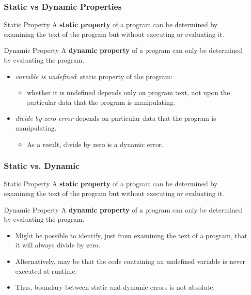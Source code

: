 \documentclass{beamer}
\begin{document}
\begin{frame}[fragile]
\frametitle{Static vs Dynamic Properties}

\begin{block}{Static Property}
A {\bf static property} of a program can be determined by examining the text of the program but without executing or evaluating it.
\end{block}

\begin{block}{Dynamic Property}
A {\bf dynamic property} of a program can only be determined by evaluating the program.
\end{block}

\pause
\begin{itemize}
\item \emph{variable is undefined}: static property of the program: 
\begin{itemize}
\item whether it is undefined depends only on program text, not upon the particular data that the program is manipulating. 
\end{itemize}

\pause
\item \emph{divide by zero error} depends on particular data that the program is manipulating. 
\begin{itemize}
\item As a result, divide by zero is a dynamic error.
\end{itemize}

\end{itemize}

\end{frame}

\begin{frame}[fragile]
\frametitle{Static vs. Dynamic}
\begin{block}{Static Property}
A {\bf static property} of a program can be determined by examining the text of the program but without executing or evaluating it.
\end{block}

\begin{block}{Dynamic Property}
A {\bf dynamic property} of a program can only be determined by evaluating the program.
\end{block}

\begin{itemize}
\item Might be possible to identify, just from examining the text of a program, that it will always divide by zero. 

\item Alternatively, may be that the code containing an undefined variable is never executed at runtime. 

\item Thus, boundary between static and dynamic errors is not absolute. 
\end{itemize}

\end{frame}
\end{document}
